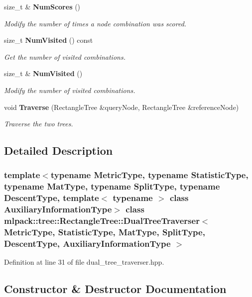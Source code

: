 \begin{DoxyCompactItemize}
size\+\_\+t \& \textbf{ Num\+Scores} ()
\begin{DoxyCompactList}\small\item\em Modify the number of times a node combination was scored. \end{DoxyCompactList}\item 
size\+\_\+t \textbf{ Num\+Visited} () const
\begin{DoxyCompactList}\small\item\em Get the number of visited combinations. \end{DoxyCompactList}\item 
size\+\_\+t \& \textbf{ Num\+Visited} ()
\begin{DoxyCompactList}\small\item\em Modify the number of visited combinations. \end{DoxyCompactList}\item 
void \textbf{ Traverse} (Rectangle\+Tree \&query\+Node, Rectangle\+Tree \&reference\+Node)
\begin{DoxyCompactList}\small\item\em Traverse the two trees. \end{DoxyCompactList}\end{DoxyCompactItemize}


\subsection{Detailed Description}
\subsubsection*{template$<$typename Metric\+Type, typename Statistic\+Type, typename Mat\+Type, typename Split\+Type, typename Descent\+Type, template$<$ typename $>$ class Auxiliary\+Information\+Type$>$\newline
class mlpack\+::tree\+::\+Rectangle\+Tree\+::\+Dual\+Tree\+Traverser$<$ Metric\+Type, Statistic\+Type, Mat\+Type, Split\+Type, Descent\+Type, Auxiliary\+Information\+Type $>$}



Definition at line 31 of file dual\+\_\+tree\+\_\+traverser.\+hpp.



\subsection{Constructor \& Destructor Documentation}
\mbox{\label{classmlpack_1_1tree_1_1RectangleTree_1_1DualTreeTraverser_abd4227fd4d7e7f3e1090233443cc265e}} 
